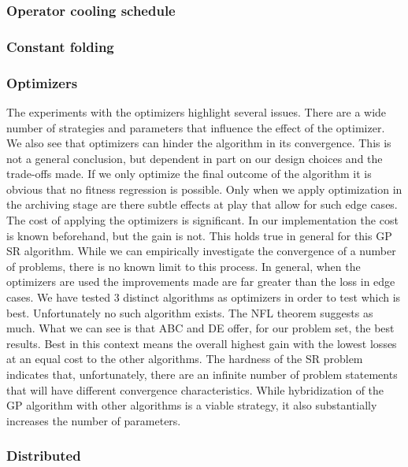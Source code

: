 \subsubsection{Operator cooling schedule}
\subsubsection{Constant folding}
\subsubsection{Optimizers}
The experiments with the optimizers highlight several issues. There are a wide number of strategies and parameters that influence the effect of the optimizer. We also see that optimizers can hinder the algorithm in its convergence. This is not a general conclusion, but dependent in part on our design choices and the trade-offs made. If we only optimize the final outcome of the algorithm it is obvious that no fitness regression is possible. Only when we apply optimization in the archiving stage are there subtle effects at play that allow for such edge cases. The cost of applying the optimizers is significant. In our implementation the cost is known beforehand, but the gain is not. This holds true in general for this GP SR algorithm. While we can empirically investigate the convergence of a number of problems, there is no known limit to this process. 
In general, when the optimizers are used the improvements made are far greater than the loss in edge cases. We have tested 3 distinct algorithms as optimizers in order to test which is best. Unfortunately no such algorithm exists. The NFL theorem \cite{NFL} suggests as much. What we can see is that ABC and DE offer, for our problem set, the best results. Best in this context means the overall highest gain with the lowest losses at an equal cost to the other algorithms. The hardness of the SR problem indicates that, unfortunately, there are an infinite number of problem statements that will have different convergence characteristics. While hybridization of the GP algorithm with other algorithms is a viable strategy, it also substantially increases the number of parameters. 
\subsubsection{Distributed}